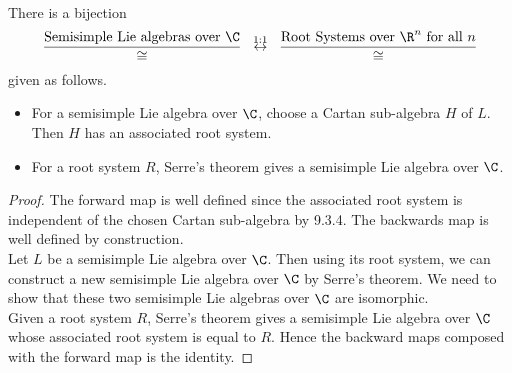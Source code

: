 \documentclass[a4paper]{article}
\begin{document}
\begin{crl}{}{} \\There is a bijection $$\frac{\text{Semisimple Lie algebras over }\C}{\cong}\;\;\overset{1:1}{\leftrightarrow}\;\;\frac{\text{Root Systems over }\R^n\text{ for all }n}{\cong}$$ given as follows. 
\begin{itemize}
\item For a semisimple Lie algebra over $\C$, choose a Cartan sub-algebra $H$ of $L$. Then $H$ has an associated root system. 
\item For a root system $R$, Serre's theorem gives a semisimple Lie algebra over $\C$. 
\end{itemize} 
\begin{proof}
The forward map is well defined since the associated root system is independent of the chosen Cartan sub-algebra by 9.3.4. The backwards map is well defined by construction. \\

Let $L$ be a semisimple Lie algebra over $\C$. Then using its root system, we can construct a new semisimple Lie algebra over $\C$ by Serre's theorem. We need to show that these two semisimple Lie algebras over $\C$ are isomorphic. \\

Given a root system $R$, Serre's theorem gives a semisimple Lie algebra over $\C$ whose associated root system is equal to $R$. Hence the backward maps composed with the forward map is the identity. 
\end{proof}
\end{crl}
\end{document}
